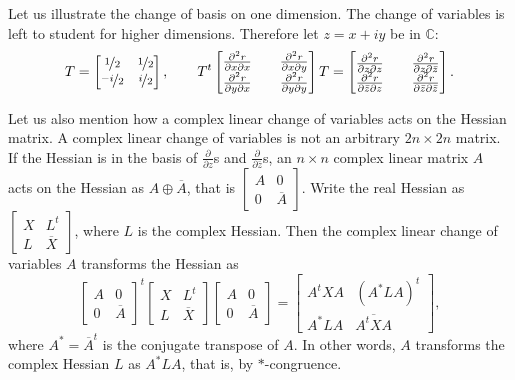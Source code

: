 \documentclass[12pt,openany]{book}
\newcommand{\C}{{\mathbb{C}}}
\theoremstyle{plain}
\theoremstyle{remark}
\theoremstyle{definition}
\theoremstyle{exercise}
\theoremstyle{example}
\begin{document}
Let us illustrate the change of basis on one dimension.  The change of
variables is left to student for higher dimensions.  Therefore let $z =
x+iy$ be in $\C$:
\begin{equation*}
T = 
\begin{bmatrix}
\nicefrac{1}{2} & \nicefrac{1}{2} \\
\nicefrac{-i}{2} & \nicefrac{i}{2}
\end{bmatrix}
,
\qquad
T^t
\begin{bmatrix}
\frac{\partial^2 r}{\partial x \partial x} &&
\frac{\partial^2 r}{\partial x \partial y}
\\
\frac{\partial^2 r}{\partial y \partial x} &&
\frac{\partial^2 r}{\partial y \partial y}
\end{bmatrix}
T
=
\begin{bmatrix}
\frac{\partial^2 r}{\partial z \partial z} &&
\frac{\partial^2 r}{\partial z \partial \bar{z}}
\\
\frac{\partial^2 r}{\partial \bar{z} \partial z} &&
\frac{\partial^2 r}{\partial \bar{z} \partial \bar{z}}
\end{bmatrix}
.
\end{equation*}

Let us also mention how a complex linear change of variables
acts on the Hessian matrix.  A complex linear change of variables is not an
arbitrary $2n \times 2n$ matrix.  If the Hessian is in the 
basis of $\frac{\partial}{\partial z}$s and
$\frac{\partial}{\partial \bar{z}}$s, an $n \times n$ complex linear matrix $A$
acts on the Hessian as $A \oplus \overline{A}$, that is
$\left[ \begin{smallmatrix} A & 0 \\ 0 & \overline{A} \end{smallmatrix}
\right]$.
Write the real Hessian as
$\left[ \begin{smallmatrix} X & L^t \\ L & \overline{X} \end{smallmatrix}
\right]$, where $L$ is the complex Hessian.  Then the complex linear change
of variables $A$ transforms
the Hessian as
\begin{equation*}
{\begin{bmatrix} A & 0 \\ 0 & \overline{A} \end{bmatrix}}^t
\begin{bmatrix} X & L^t \\ L & \overline{X} \end{bmatrix}
\begin{bmatrix} A & 0 \\ 0 & \overline{A} \end{bmatrix}
=
\begin{bmatrix} A^tXA & {(A^*LA)}^t \\ A^*LA & \overline{A^tXA} \end{bmatrix} ,
\end{equation*}
where $A^* = \overline{A}^t$ is the conjugate
transpose of $A$.
In other words, $A$
transforms the complex Hessian $L$ as $A^* L A$, that is, by $*$-congruence.
\end{document}
